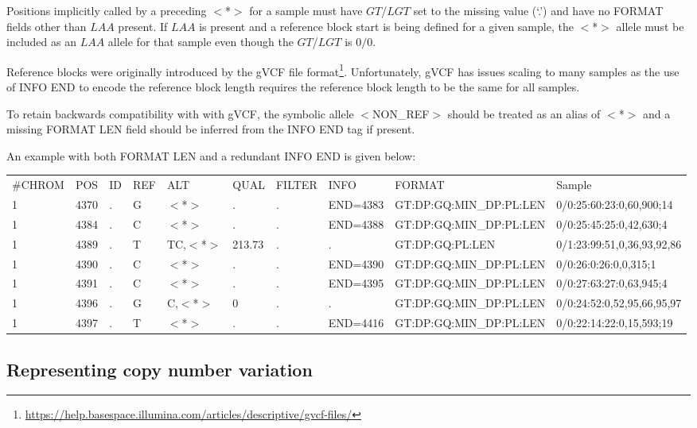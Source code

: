 \documentclass[8pt]{article}
\begin{document}
Positions implicitly called by a preceding $<$*$>$ for a sample must have $GT$/$LGT$ set to the missing value (`.') and have no FORMAT fields other than $LAA$ present.
If $LAA$ is present and a reference block start is being defined for a given sample, the $<$*$>$ allele must be included as an $LAA$ allele for that sample even though the $GT$/$LGT$ is $0/0$.

Reference blocks were originally introduced by the gVCF file format\footnote{\url{https://help.basespace.illumina.com/articles/descriptive/gvcf-files/}}.
Unfortunately, gVCF has issues scaling to many samples as the use of INFO END to encode the reference block length requires the reference block length to be the same for all samples.

To retain backwards compatibility with with gVCF,
the symbolic allele $<$NON\_REF$>$ should be treated as an alias of $<$*$>$
and a missing FORMAT LEN field should be inferred from the INFO END tag if present.

An example with both FORMAT LEN and a redundant INFO END is given below:
\scriptsize
\begin{flushleft}
\begin{tabular}{ l l l l l l l l l l }
\#CHROM & POS & ID & REF & ALT & QUAL & FILTER & INFO & FORMAT & Sample \\
1 & 4370 & . & G & $<$*$>$ & . & . & END=4383 & GT:DP:GQ:MIN\_DP:PL:LEN & 0/0:25:60:23:0,60,900;14 \\
1 & 4384 & . & C & $<$*$>$ & . & . & END=4388 & GT:DP:GQ:MIN\_DP:PL:LEN & 0/0:25:45:25:0,42,630;4 \\
1 & 4389 & . & T & TC,$<$*$>$ & 213.73 & . & . & GT:DP:GQ:PL:LEN & 0/1:23:99:51,0,36,93,92,86 \\
1 & 4390 & . & C & $<$*$>$ & . & . & END=4390 & GT:DP:GQ:MIN\_DP:PL:LEN & 0/0:26:0:26:0,0,315;1 \\
1 & 4391 & . & C & $<$*$>$ & . & . & END=4395 & GT:DP:GQ:MIN\_DP:PL:LEN & 0/0:27:63:27:0,63,945;4 \\
1 & 4396 & . & G & C,$<$*$>$ & 0 & . & . & GT:DP:GQ:MIN\_DP:PL:LEN & 0/0:24:52:0,52,95,66,95,97 \\
1 & 4397 & . & T & $<$*$>$ & . & . & END=4416 & GT:DP:GQ:MIN\_DP:PL:LEN & 0/0:22:14:22:0,15,593;19 \\
\end{tabular}
\end{flushleft}
\normalsize

\pagebreak
\subsection{Representing copy number variation}
\label{cnv}
\end{document}
